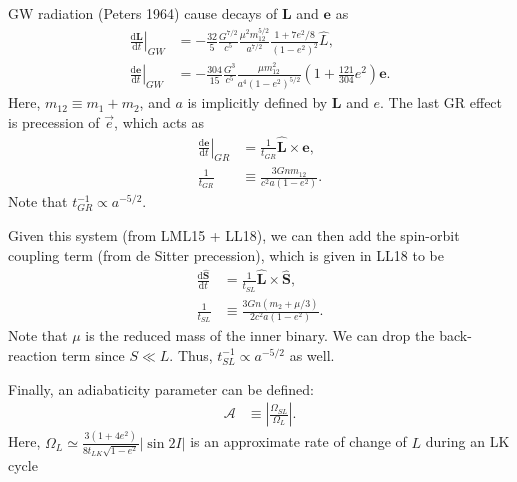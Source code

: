 \documentclass[11pt,
        usenames, %
        dvipsnames %
    ]{article}
\newcommand*{\rd}[2]{\frac{\mathrm{d}#1}{\mathrm{d}#2}}
\newcommand*{\bm}[1]{\boldsymbol{\mathbf{#1}}}
\newcommand*{\at}[1]{\left.#1\right|}
\newcommand*{\abs}[1]{\left|#1\right|}
\newcommand*{\p}[1]{\left(#1\right)}
\begin{document}
GW radiation (Peters 1964) cause decays of $\bm{L}$ and $\bm{e}$ as
\begin{align}
    \at{\rd{\bm{L}}{t}}_{GW} &= -\frac{32}{5}\frac{G^{7/2}}{c^5}
        \frac{\mu^2 m_{12}^{5/2}}{a^{7/2}}
        \frac{1 + 7e^2/8}{\p{1 - e^2}^2}\hat{L},\\
    \at{\rd{\bm{e}}{t}}_{GW} &= -\frac{304}{15} \frac{G^3}{c^5}
        \frac{\mu m_{12}^2}{a^4\p{1 - e^2}^{5/2}}\p{1 + \frac{121}{304}
            e^2}\bm{e}.
\end{align}
Here, $m_{12} \equiv m_1 + m_2$, and $a$ is implicitly defined by $\bm{L}$ and
$e$. The last GR effect is precession of $\vec{e}$, which acts as
\begin{align}
    \at{\rd{\bm{e}}{t}}_{GR} &= \frac{1}{t_{GR}}\hat{\bm{L}} \times \bm{e},\\
    \frac{1}{t_{GR}} &\equiv \frac{3Gnm_{12}}{c^2a\p{1 - e^2}}.
\end{align}
Note that $t_{GR}^{-1} \propto a^{-5/2}$.

Given this system (from LML15 + LL18), we can then add the spin-orbit coupling
term (from de Sitter precession), which is given in LL18 to be
\begin{align}
    \rd{\hat{\bm{S}}}{t} &= \frac{1}{t_{SL}}\hat{\bm{L}} \times \hat{\bm{S}},\\
    \frac{1}{t_{SL}} &\equiv \frac{3Gn\p{m_2 + \mu/3}}{2c^2a\p{1 - e^2}}.
\end{align}
Note that $\mu$ is the reduced mass of the inner binary. We can drop the
back-reaction term since $S \ll L$. Thus, $t_{SL}^{-1} \propto a^{-5/2}$ as
well.

Finally, an adiabaticity parameter can be defined:
\begin{align}
    \mathcal{A} &\equiv \abs{\frac{\Omega_{SL}}{\Omega_L}}.
\end{align}
Here, $\Omega_L \simeq\frac{3\p{1 + 4e^2}}{8t_{LK}\sqrt{1 - e^2}}\abs{\sin
2I}$ is an approximate rate of change of $L$ during an LK cycle
\end{document}
